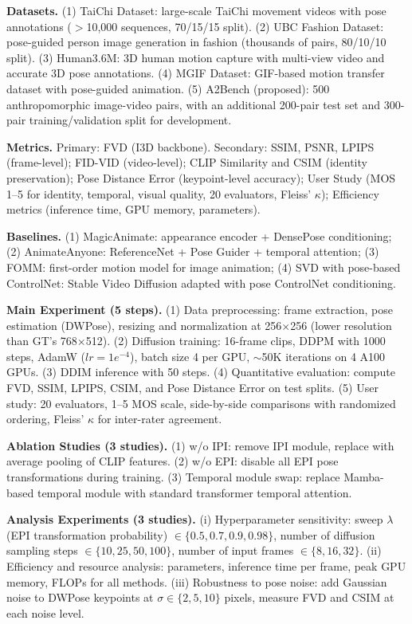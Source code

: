\begin{tcolorbox}[
	title={Box 17: Case 3 --- DeepSeek V3.2 CoT+Search Baseline Output},
	colback=green!3!white,
	colframe=green!30!black,
	colbacktitle=green!15!white,
	coltitle=black,
	fonttitle=\bfseries,
	arc=3mm,
	boxrule=0.8pt,
	breakable
]
\small
\textbf{Datasets.} (1) TaiChi Dataset: large-scale TaiChi movement videos with pose annotations ($>$10,000 sequences, 70/15/15 split). (2) UBC Fashion Dataset: pose-guided person image generation in fashion (thousands of pairs, 80/10/10 split). (3) Human3.6M: 3D human motion capture with multi-view video and accurate 3D pose annotations. (4) MGIF Dataset: GIF-based motion transfer dataset with pose-guided animation. (5) A2Bench (proposed): 500 anthropomorphic image-video pairs, with an additional 200-pair test set and 300-pair training/validation split for development.

\smallskip
\textbf{Metrics.} Primary: FVD (I3D backbone). Secondary: SSIM, PSNR, LPIPS (frame-level); FID-VID (video-level); CLIP Similarity and CSIM (identity preservation); Pose Distance Error (keypoint-level accuracy); User Study (MOS 1--5 for identity, temporal, visual quality, 20 evaluators, Fleiss' $\kappa$); Efficiency metrics (inference time, GPU memory, parameters).

\smallskip
\textbf{Baselines.} (1) MagicAnimate: appearance encoder + DensePose conditioning; (2) AnimateAnyone: ReferenceNet + Pose Guider + temporal attention; (3) FOMM: first-order motion model for image animation; (4) SVD with pose-based ControlNet: Stable Video Diffusion adapted with pose ControlNet conditioning.

\smallskip
\textbf{Main Experiment (5 steps).} (1) Data preprocessing: frame extraction, pose estimation (DWPose), resizing and normalization at 256$\times$256 (lower resolution than GT's 768$\times$512). (2) Diffusion training: 16-frame clips, DDPM with 1000 steps, AdamW ($lr=1e^{-4}$), batch size 4 per GPU, $\sim$50K iterations on 4 A100 GPUs. (3) DDIM inference with 50 steps. (4) Quantitative evaluation: compute FVD, SSIM, LPIPS, CSIM, and Pose Distance Error on test splits. (5) User study: 20 evaluators, 1--5 MOS scale, side-by-side comparisons with randomized ordering, Fleiss' $\kappa$ for inter-rater agreement.

\smallskip
\textbf{Ablation Studies (3 studies).} (1) w/o IPI: remove IPI module, replace with average pooling of CLIP features. (2) w/o EPI: disable all EPI pose transformations during training. (3) Temporal module swap: replace Mamba-based temporal module with standard transformer temporal attention.

\smallskip
\textbf{Analysis Experiments (3 studies).} (i) Hyperparameter sensitivity: sweep $\lambda$ (EPI transformation probability) $\in\{0.5,0.7,0.9,0.98\}$, number of diffusion sampling steps $\in\{10,25,50,100\}$, number of input frames $\in\{8,16,32\}$. (ii) Efficiency and resource analysis: parameters, inference time per frame, peak GPU memory, FLOPs for all methods. (iii) Robustness to pose noise: add Gaussian noise to DWPose keypoints at $\sigma\in\{2,5,10\}$ pixels, measure FVD and CSIM at each noise level.
\end{tcolorbox}

